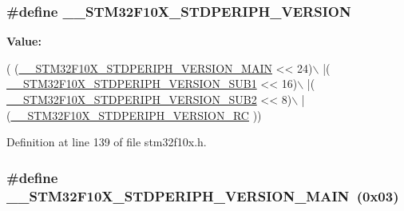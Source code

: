 \subsubsection[{\texorpdfstring{\+\_\+\+\_\+\+S\+T\+M32\+F10\+X\+\_\+\+S\+T\+D\+P\+E\+R\+I\+P\+H\+\_\+\+V\+E\+R\+S\+I\+ON}{__STM32F10X_STDPERIPH_VERSION}}]{\setlength{\rightskip}{0pt plus 5cm}\#define \+\_\+\+\_\+\+S\+T\+M32\+F10\+X\+\_\+\+S\+T\+D\+P\+E\+R\+I\+P\+H\+\_\+\+V\+E\+R\+S\+I\+ON}\hypertarget{group___library__configuration__section_gafb19c8675ea01accc2f8e5f467827328}{}\label{group___library__configuration__section_gafb19c8675ea01accc2f8e5f467827328}
{\bfseries Value\+:}
\begin{DoxyCode}
( (\hyperlink{group___library__configuration__section_ga4c236abf68876febcb304f05ed3bafac}{\_\_STM32F10X\_STDPERIPH\_VERSION\_MAIN} << 24)\(\backslash\)
                                             |(
      \hyperlink{group___library__configuration__section_ga7ce69a7c755b9d0551e9755d28612cb0}{\_\_STM32F10X\_STDPERIPH\_VERSION\_SUB1} << 16)\(\backslash\)
                                             |(
      \hyperlink{group___library__configuration__section_ga3ec41777ab08436b801c9c295248a6c7}{\_\_STM32F10X\_STDPERIPH\_VERSION\_SUB2} << 8)\(\backslash\)
                                             |(\hyperlink{group___library__configuration__section_gae0abedef178fde6294fdfd3401ef6e2c}{\_\_STM32F10X\_STDPERIPH\_VERSION\_RC}
      ))
\end{DoxyCode}


Definition at line 139 of file stm32f10x.\+h.

\subsubsection[{\texorpdfstring{\+\_\+\+\_\+\+S\+T\+M32\+F10\+X\+\_\+\+S\+T\+D\+P\+E\+R\+I\+P\+H\+\_\+\+V\+E\+R\+S\+I\+O\+N\+\_\+\+M\+A\+IN}{__STM32F10X_STDPERIPH_VERSION_MAIN}}]{\setlength{\rightskip}{0pt plus 5cm}\#define \+\_\+\+\_\+\+S\+T\+M32\+F10\+X\+\_\+\+S\+T\+D\+P\+E\+R\+I\+P\+H\+\_\+\+V\+E\+R\+S\+I\+O\+N\+\_\+\+M\+A\+IN~(0x03)}\hypertarget{group___library__configuration__section_ga4c236abf68876febcb304f05ed3bafac}{}\label{group___library__configuration__section_ga4c236abf68876febcb304f05ed3bafac}


